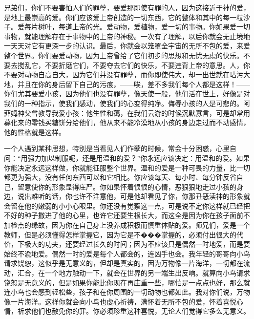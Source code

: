 \par 兄弟们，你们不要害怕人们的罪孽，要爱那即使有罪的人，因为这接近于神的爱，是地上最崇高的爱。你们应该爱上帝创造的一切东西，它的整体和其中的每一粒沙子。爱每片树叶，每道上帝的光。爱动物，爱植物，爱一切的事物。你如果爱一切事物，就能理解存在于事物中的上帝的神秘。一次有了理解，以后你就会无止境地一天天对它有更深一步的认识。最后，你就会以笼罩全宇宙的无所不包的爱，来爱整个世界。你们要爱动物，因为上帝曾给了它们初步的思想和无忧无虑的快乐。不要去搅乱它，不要折磨它们，不要夺去它们的快乐，不要违背上帝的意思。人，你不要对动物自高自大，因为它们并没有罪孽，而你即使伟大，却一出世就在玷污大地，并且在你的身后留下自己的污痕，——唉，差不多我们每个人都是这样！——你们尤其要爱小孩，因为他们也没有罪孽，像天使一般，他们活在世上，好像是对我们的一种指示，使我们感动，使我们的心变得纯净。侮辱小孩的人是可悲的。阿菲姆神父曾教导我爱小孩：他生性和蔼，在我们云游的时候沉默寡言，可是却常用募化来的零钱买糖饼分给他们，他从来不能冷漠地从小孩的身边走过而不动感情，他的性格就是这样。
\par 一个人遇到某种思想，特别是当看见人们作孽的时候，常会十分困惑，心里自问：“用强力加以制服呢，还是用温和的爱？”你永远应该决定：用温和的爱。如果你能决定永远这样做，你就能征服整个世界。温和的爱是一种可畏的力量，比一切都更为强大，没有任何东西可以和它相比。你应该每天、每小时、每分钟反省自己，留意使你的形象显得庄严。你如果怀着恨恨的心情，恶狠狠地走过小孩的身边，说出难听的话，你也许不注意他，可是他却看见了你，你那丑恶渎神的形象就会留在他的嫩弱的小小心眼里。你还没有觉察这一点，可是说不定你这样就已经把不好的种子撒进了他的心里，也许它还要生根长大，而这全是因为你在孩子面前不加检点的缘故，因为你在自己身上没养成积极而慎重体贴的爱。师兄们，爱是一个教师，但是必须懂得怎样掌握它，因为它是不���掌握的，必须付出很大的代价，下极大的功夫，还要经过长久的时间；因为不应该只是偶然一时地爱，而是要始终不渝地爱。偶然一时的爱是每个人都会的，连凶手也会。我年轻的哥哥向小鸟请求饶恕，这似乎是无意义的，但却是真实的，因为万物像一片海洋，一切都在流动，汇合，在一个地方触动一下，就会在世界的另一端生出反响。就算向小鸟请求饶恕是无意义的，但是如果你能比你现在再庄重一些，哪怕是一点点也好，那么就连小鸟也会感到轻松些，孩子和在你周围的一切动物也都如此。我对你们说，万物像一片海洋。这样你就会向小鸟也虔心祈祷，满怀着无所不包的爱，怀着喜悦心情，祈求他们也赦免你的罪。你必须珍重这种喜悦，无论人们觉得它多么无意义。

